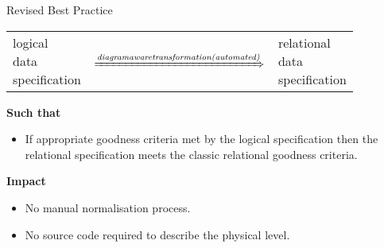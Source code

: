 \begin{frame}{Revised Best Practice}
\begin{center}
\begin{tabular}{ p{1.25cm} p{2cm} p{1.25cm}}
\parbox{3cm}{logical \\ data \\ specification}
&  $\xRightarrow{\parbox{2cm}{\textit{diagram \\ aware \\ transformation \\ (automated)}}
                }$ 
& \parbox{3cm}{relational \\ data \\specification}
\end{tabular}
\end{center}
\textbf{Such that}
\begin{itemize}
	\item If appropriate goodness criteria met by the logical specification 
	then the relational specification meets the classic relational goodness criteria.
\end{itemize}
\textbf{Impact}
\begin{itemize}
	\item No manual normalisation process.
	\item No source code required to describe the physical level.
\end{itemize}
\end{frame}